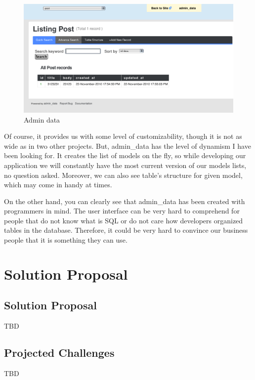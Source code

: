     \begin{figure}[hbt!]
  		\begin{center}
  			\includegraphics[width=\linewidth]{images/chapter01/admindata1.png}
  			\caption{Admin data}
  			\label{admindata1}
  		\end{center}
  	\end{figure}
  
  Of course, it provides us with some level of customizability, though it is not as wide as in two other projects. But, admin\_data has the level of dynamism I have been looking for. It creates the list of models on the fly, so while developing our application we will constantly have the most current version of our models lists, no question asked. Moreover, we can also see table's structure for given model, which may come in handy at times.
  
  On the other hand, you can clearly see that admin\_data has been created with programmers in mind. The user interface can be very hard to comprehend for people that do not know what is SQL or do not care how developers organized tables in the database. Therefore, it could be very hard to convince our business people that it is something they can use.
  
  \section{Solution Proposal}
    \subsection{Solution Proposal}
    TBD
  
    \subsection{Projected Challenges}
    TBD